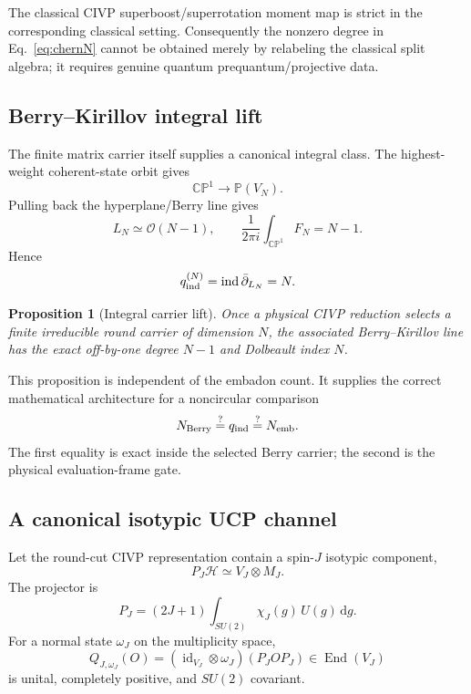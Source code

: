 \documentclass[aps,prd,preprint,nofootinbib,superscriptaddress]{revtex4-2}
\newtheorem{proposition}[theorem]{Proposition}
\theoremstyle{definition}
\theoremstyle{remark}
\newcommand{\id}{\operatorname{id}}
\newcommand{\cO}{\mathcal O}
\newcommand{\dd}{\mathrm d}
\newcommand{\ind}{\operatorname{ind}}
\newcommand{\CP}{\mathbb{CP}}
\begin{document}
The classical CIVP superboost/superrotation moment map is strict in the corresponding classical setting.  Consequently the nonzero degree in Eq.~\eqref{eq:chernN} cannot be obtained merely by relabeling the classical split algebra; it requires genuine quantum prequantum/projective data.

\subsection{Berry--Kirillov integral lift}

The finite matrix carrier itself supplies a canonical integral class.  The highest-weight coherent-state orbit gives
\begin{equation}
\CP^1
\longrightarrow
\mathbb P(V_N).
\end{equation}
Pulling back the hyperplane/Berry line gives
\begin{equation}
L_N\simeq\cO(N-1),
\qquad
\frac1{2\pi i}\int_{\CP^1}F_N=N-1.
\label{eq:berrydegree}
\end{equation}
Hence
\begin{equation}
q_{\rm ind}^{(N)}
=
\ind\bar\partial_{L_N}
=
N.
\label{eq:berryindex}
\end{equation}

\begin{proposition}[Integral carrier lift]
\label{prop:berrylift}
Once a physical CIVP reduction selects a finite irreducible round carrier of dimension $N$, the associated Berry--Kirillov line has the exact off-by-one degree $N-1$ and Dolbeault index $N$.
\end{proposition}

This proposition is independent of the embadon count.  It supplies the correct mathematical architecture for a noncircular comparison
\begin{equation}
N_{\rm Berry}
\stackrel{?}{=}
q_{\rm ind}
\stackrel{?}{=}
N_{\rm emb}.
\label{eq:independentintegers}
\end{equation}
The first equality is exact inside the selected Berry carrier; the second is the physical evaluation-frame gate.

\subsection{A canonical isotypic UCP channel}

Let the round-cut CIVP representation contain a spin-$J$ isotypic component,
\begin{equation}
P_J\mathcal H
\simeq
V_J\otimes M_J.
\end{equation}
The projector is
\begin{equation}
P_J
=
(2J+1)
\int_{SU(2)}
\chi_J(g)\,U(g)\,\dd g.
\label{eq:isotypicprojector}
\end{equation}
For a normal state $\omega_J$ on the multiplicity space,
\begin{equation}
Q_{J,\omega_J}(O)
=
(\id_{V_J}\otimes\omega_J)
(P_JOP_J)
\in\operatorname{End}(V_J)
\label{eq:finiteUCP}
\end{equation}
is unital, completely positive, and $SU(2)$ covariant.
\end{document}
